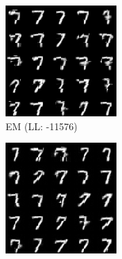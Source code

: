 \begin{figure}[H]
\begin{subfigure}[b]{0.24\textwidth}
        \includegraphics[width=\textwidth]{figures/einsum/mnist/[7]_EM.png}
        \caption{EM (LL: -11576)}
    \end{subfigure}
    \begin{subfigure}[b]{0.24\textwidth}
        \centering
        \includegraphics[width=\textwidth]{figures/einsum/mnist/[7]_SGD.png} 

\end{subfigure}
\end{figure}
